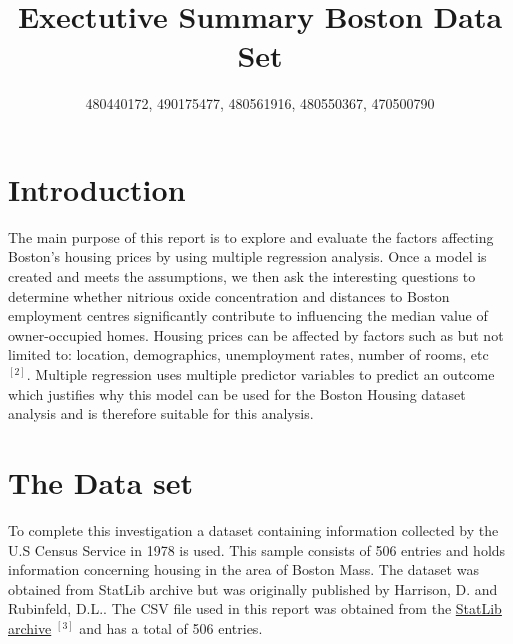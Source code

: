 \documentclass[a4paper,9pt,twocolumn,twoside,]{pinp}
\title{Exectutive Summary \textbar{} Boston Data Set}
\author[]{480440172, 490175477, 480561916, 480550367, 470500790}
\affil[]{DATA2002 Group M13-07}
\begin{document}
\verticaladjustment{-2pt}

\maketitle
\thispagestyle{firststyle}



\hypertarget{introduction}{%
\section{Introduction}\label{introduction}}

The main purpose of this report is to explore and evaluate the factors
affecting Boston's housing prices by using multiple regression analysis.
Once a model is created and meets the assumptions, we then ask the
interesting questions to determine whether nitrious oxide concentration
and distances to Boston employment centres significantly contribute to
influencing the median value of owner-occupied homes. Housing prices can
be affected by factors such as but not limited to: location,
demographics, unemployment rates, number of rooms, etc \(^{[2]}\).
Multiple regression uses multiple predictor variables to predict an
outcome which justifies why this model can be used for the Boston
Housing dataset analysis and is therefore suitable for this analysis.

\hypertarget{the-data-set}{%
\section{The Data set}\label{the-data-set}}

To complete this investigation a dataset containing information
collected by the U.S Census Service in 1978 is used. This sample
consists of 506 entries and holds information concerning housing in the
area of Boston Mass. The dataset was obtained from StatLib archive but
was originally published by Harrison, D. and Rubinfeld, D.L.. The CSV
file used in this report was obtained from the
\href{“http://lib.stat.cmu.edu/datasets/boston”}{StatLib archive}
\(^{[3]}\) and has a total of 506 entries.
\end{document}
